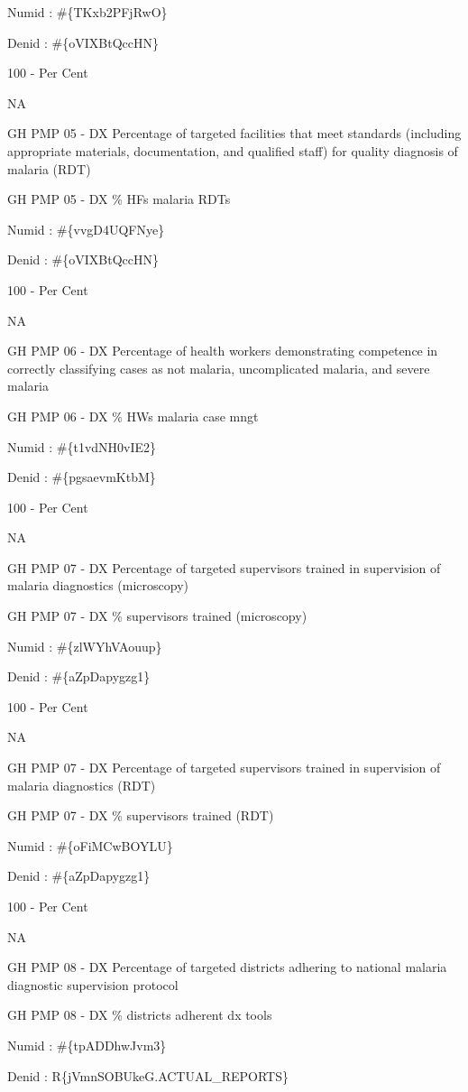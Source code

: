 \documentclass[]{book}
\begin{document}
Numid : \#\{TKxb2PFjRwO\}

Denid : \#\{oVIXBtQccHN\}

100 - Per Cent

NA

GH PMP 05 - DX Percentage of targeted facilities that meet standards (including appropriate materials, documentation, and qualified staff) for quality diagnosis of malaria (RDT)

GH PMP 05 - DX \% HFs malaria RDTs

Numid : \#\{vvgD4UQFNye\}

Denid : \#\{oVIXBtQccHN\}

100 - Per Cent

NA

GH PMP 06 - DX Percentage of health workers demonstrating competence in correctly classifying cases as not malaria, uncomplicated malaria, and severe malaria

GH PMP 06 - DX \% HWs malaria case mngt

Numid : \#\{t1vdNH0vIE2\}

Denid : \#\{pgsaevmKtbM\}

100 - Per Cent

NA

GH PMP 07 - DX Percentage of targeted supervisors trained in supervision of malaria diagnostics (microscopy)

GH PMP 07 - DX \% supervisors trained (microscopy)

Numid : \#\{zlWYhVAouup\}

Denid : \#\{aZpDapygzg1\}

100 - Per Cent

NA

GH PMP 07 - DX Percentage of targeted supervisors trained in supervision of malaria diagnostics (RDT)

GH PMP 07 - DX \% supervisors trained (RDT)

Numid : \#\{oFiMCwBOYLU\}

Denid : \#\{aZpDapygzg1\}

100 - Per Cent

NA

GH PMP 08 - DX Percentage of targeted districts adhering to national malaria diagnostic supervision protocol

GH PMP 08 - DX \% districts adherent dx tools

Numid : \#\{tpADDhwJvm3\}

Denid : R\{jVmnSOBUkeG.ACTUAL\_REPORTS\}
\end{document}
